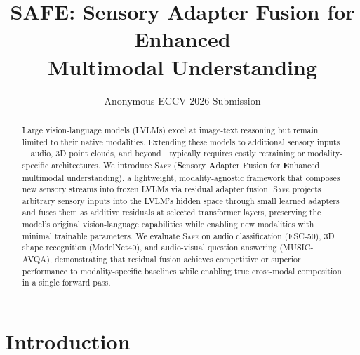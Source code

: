 \documentclass[runningheads]{llncs}
\newcommand{\safe}{\textsc{Safe}}
\begin{document}
\title{SAFE: Sensory Adapter Fusion for Enhanced\\Multimodal Understanding}


\author{Anonymous ECCV 2026 Submission}

\maketitle

\begin{abstract}
Large vision-language models (LVLMs) excel at image-text reasoning but remain limited to their native modalities.
Extending these models to additional sensory inputs---audio, 3D point clouds, and beyond---typically requires costly retraining or modality-specific architectures.
We introduce \safe{} (\textbf{S}ensory \textbf{A}dapter \textbf{F}usion for \textbf{E}nhanced multimodal understanding), a lightweight, modality-agnostic framework that composes new sensory streams into frozen LVLMs via residual adapter fusion.
\safe{} projects arbitrary sensory inputs into the LVLM's hidden space through small learned adapters and fuses them as additive residuals at selected transformer layers, preserving the model's original vision-language capabilities while enabling new modalities with minimal trainable parameters.
We evaluate \safe{} on audio classification (ESC-50), 3D shape recognition (ModelNet40), and audio-visual question answering (MUSIC-AVQA), demonstrating that residual fusion achieves competitive or superior performance to modality-specific baselines while enabling true cross-modal composition in a single forward pass.

\end{abstract}

\section{Introduction}
\label{sec:intro}

\end{document}
